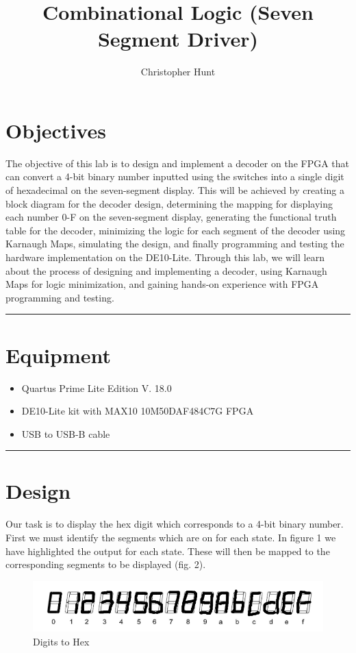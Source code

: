\documentclass{article}
\title{\textbf{{\huge Combinational Logic (Seven Segment Driver)}}}
\author{Christopher Hunt}
\date{}
\begin{document}
\pagestyle{fancy}
\fancyhf{}
\rhead{\thepage}
\maketitle
\section*{\textcolor{mycolor}{Objectives}}
The objective of this lab is to design and implement a decoder on the FPGA that can convert a 4-bit binary number inputted using the switches into a single digit of hexadecimal on the seven-segment display. This will be achieved by creating a block diagram for the decoder design, determining the mapping for displaying each number 0-F on the seven-segment display, generating the functional truth table for the decoder, minimizing the logic for each segment of the decoder using Karnaugh Maps, simulating the design, and finally programming and testing the hardware implementation on the DE10-Lite. Through this lab, we will learn about the process of designing and implementing a decoder, using Karnaugh Maps for logic minimization, and gaining hands-on experience with FPGA programming and testing.
\vspace{5mm}
\hrule

\section*{\textcolor{mycolor}{Equipment}}
\begin{itemize}
\item Quartus Prime Lite Edition V. 18.0
\item DE10-Lite kit with MAX10 10M50DAF484C7G FPGA
\item USB to USB-B cable
\end{itemize}
\vspace{5mm}
\hrule

\section*{\textcolor{mycolor}{Design}}
Our task is to display the hex digit which corresponds to a 4-bit binary number. First we must identify the segments which are on for each state. In figure 1 we have highlighted the output for each state. These will then be mapped to the corresponding segments to be displayed (fig. 2).

\begin{figure}[H]
  \centering
  \includegraphics[width=1\textwidth]{digits.png}
  \caption{Digits to Hex}
\end{figure}
\end{document}
